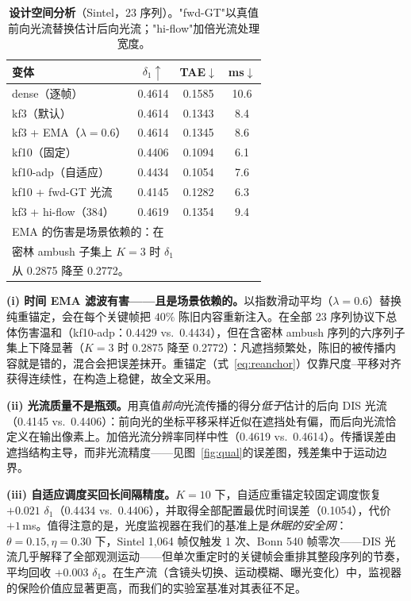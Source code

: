 \documentclass[10pt,twocolumn]{article}
\begin{document}
\begin{table}[t]
\centering\small
\setlength{\tabcolsep}{3.2pt}
\caption{\textbf{设计空间分析}（Sintel，23 序列）。"fwd-GT"以真值前向光流替换估计后向光流；"hi-flow"加倍光流处理宽度。}
\label{tab:ablation}
\begin{tabular}{lccc}
\toprule
变体 & $\delta_1{\uparrow}$ & TAE$\downarrow$ & ms$\downarrow$\\
\midrule
dense（逐帧） & 0.4614 & 0.1585 & 10.6\\
kf3（默认） & 0.4614 & 0.1343 & 8.4\\
kf3 + EMA（$\lambda{=}0.6$） & 0.4614 & 0.1345 & 8.6\\
kf10（固定） & 0.4406 & 0.1094 & 6.1\\
kf10-adp（自适应） & 0.4434 & 0.1054 & 7.6\\
kf10 + fwd-GT 光流 & 0.4145 & 0.1282 & 6.3\\
kf3 + hi-flow（384） & 0.4619 & 0.1354 & 9.4\\
\bottomrule
\multicolumn{4}{l}{\footnotesize EMA 的伤害是场景依赖的：在}\\
\multicolumn{4}{l}{\footnotesize 密林 ambush 子集上 $K{=}3$ 时 $\delta_1$}\\
\multicolumn{4}{l}{\footnotesize 从 0.2875 降至 0.2772。}\\
\end{tabular}
\end{table}

\textbf{(i) 时间 EMA 滤波有害——且是场景依赖的。}以指数滑动平均（$\lambda{=}0.6$）替换纯重锚定，会在每个关键帧把 $40\%$ 陈旧内容重新注入。在全部 23 序列协议下总体伤害温和（kf10-adp：0.4429 vs.\ 0.4434），但在含密林 ambush 序列的六序列子集上下降显著（$K{=}3$ 时 0.2875 降至 0.2772）：凡遮挡频繁处，陈旧的被传播内容就是错的，混合会把误差抹开。重锚定（式~\ref{eq:reanchor}）仅靠尺度--平移对齐获得连续性，在构造上稳健，故全文采用。

\textbf{(ii) 光流质量不是瓶颈。}用真值\emph{前向}光流传播的得分\emph{低于}估计的后向 DIS 光流（0.4145 vs.\ 0.4406）：前向光的坐标平移采样近似在遮挡处有偏，而后向光流恰定义在输出像素上。加倍光流分辨率同样中性（0.4619 vs.\ 0.4614）。传播误差由遮挡结构主导，而非光流精度——见图~\ref{fig:qual}的误差图，残差集中于运动边界。

\textbf{(iii) 自适应调度买回长间隔精度。}$K{=}10$ 下，自适应重锚定较固定调度恢复 $+0.021$ $\delta_1$（0.4434 vs.\ 0.4406），并取得全部配置最优时间误差（0.1054），代价 $+1$\,ms。值得注意的是，光度监视器在我们的基准上是\emph{休眠的安全网}：$\theta{=}0.15,\eta{=}0.30$ 下，Sintel 1{,}064 帧仅触发 1 次、Bonn 540 帧零次——DIS 光流几乎解释了全部观测运动——但单次重定时的关键帧会重排其整段序列的节奏，平均回收 $+0.003$ $\delta_1$。在生产流（含镜头切换、运动模糊、曝光变化）中，监视器的保险价值应显著更高，而我们的实验室基准对其表征不足。
\end{document}
